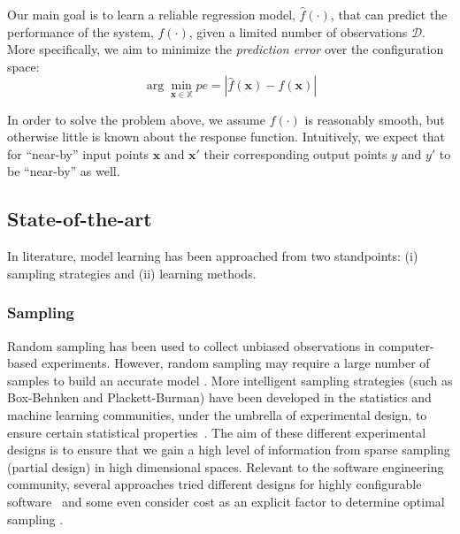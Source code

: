 Our main goal is to learn a reliable regression model, $\hat{f}(\cdot)$, that can predict the performance of the system, $f(\cdot)$, given a limited number of observations $\mathcal{D}$. More specifically, we aim to minimize the \emph{prediction error} over the configuration space:
\begin{equation} \label{eq:objective}
\arg \min _{\mathbf{x}\in\mathbb{X}} pe=|\hat{f}(\mathbf{x})-f(\mathbf{x})|
\end{equation}

In order to solve the problem above, we assume $f(\cdot)$ is reasonably smooth, but otherwise little is known about the response function. Intuitively, we expect that for ``near-by'' input points $\mathbf{x}$ and $\mathbf{x}'$ their corresponding output points $y$ and $y'$ to be ``near-by'' as well. %


\subsection{State-of-the-art}
In literature, model learning has been approached from two standpoints: (i) sampling strategies and (ii) learning methods.

\subsubsection{Sampling}
Random sampling has been used to collect unbiased observations in computer-based experiments. However, random sampling may require a large number of samples to build an accurate model \cite{influence}.
More intelligent sampling strategies (such as Box-Behnken and Plackett-Burman) have been developed in the statistics and machine learning communities, under the umbrella of experimental design, to ensure certain statistical properties~\cite{montgomery2008design}. The aim of these different experimental designs is to ensure that we gain a high level of information from sparse sampling (partial design) in high dimensional spaces. Relevant to the software engineering community, several approaches tried different designs for highly configurable software~\cite{guo2013variability} and some even consider cost as an explicit factor to determine optimal sampling \cite{sarkar2015cost}.

